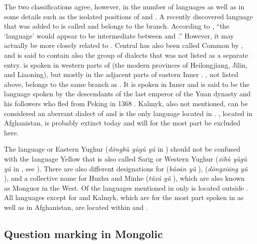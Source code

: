 The two classifications agree, however, in the number of languages as well as in some details such as the isolated positions of  and . A recently discovered language that was added to  is called  and belongs to the  branch. According to \citet[347]{Kim2003}, “the  ‘language’ would appear to be intermediate between  and .” However, it may actually be more closely related to  \citep[66]{Siqinchaoketu2002}. Central  has also been called Common  by \cite[3f.]{Janhunen2012c}, and is said to contain also the  group of dialects that was not listed as a separate entry.  is spoken in western parts of  (the modern provinces of Heilongjiang, Jilin, and Liaoning), but mostly in the adjacent parts of eastern Inner  \citep[4]{Janhunen2012c}. , not listed above, belongs to the same branch as . It is spoken in Inner  and is said to be the language spoken by the descendants of the last emperor of the  Yuan dynasty and his followers who fled from Peking in 1368 \citep[1]{Sechenbaatar2003}. Kalmyk, also not mentioned, can be considered an aberrant dialect of  and is the only  language located in . , located in Afghanistan, is probably extinct today and will for the most part be excluded here.

\newpage 
The  language  or Eastern Yughur (\textit{d\=o}\textit{ngbù yùgù yǔ}  in ) should not be confused with the  language Yellow  that is also called Sarig or Western Yughur (\textit{x\={\i}bù yùgù yǔ}  in , see ). There are also different  designations for  (\textit{bǎo\=an yǔ} ),  (\textit{d\=o}\textit{ngxi\=ang yǔ} ), and a collective name for Huzhu  and Minhe  (\textit{tǔzú yǔ} ), which are also known as Monguor in the West. Of the languages mentioned in  only  is located outside . All  languages except for  and Kalmyk, which are for the most part spoken in  as well as  in Afghanistan, are located within  and .

\subsection{Question marking in Mongolic}\label{sec:5.8.2}

